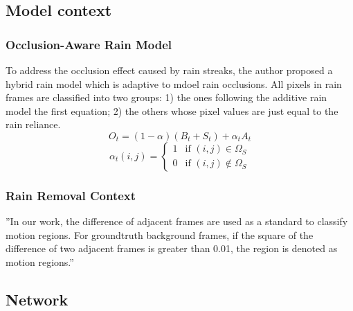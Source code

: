 \documentclass{article}
\begin{document}
\subsection{Model context}
\subsubsection{Occlusion-Aware Rain Model}
To address the occlusion effect caused by rain streaks, the author proposed a hybrid rain model which is adaptive to mdoel rain occlusions. All pixels in rain frames are classified into two groups: 1) the ones following the additive rain model the first equation; 2) the others whose pixel values are just equal to the rain reliance.
\begin{equation}
O_t=(1-\alpha)(B_t+S_t)+\alpha_tA_t
\end{equation}
\begin{equation}
\alpha_t(i,j)=
	\begin{cases}
		1 & \text{if $(i,j)\in \Omega_S$}\\
		0 & \text{if $(i,j)\not\in \Omega_S$}
	\end{cases}
\end{equation}
\subsubsection{Rain Removal Context}
''In our work, the difference of adjacent frames are used as a standard to classify motion regions. For groundtruth background frames, if the square of the difference of two adjacent frames is greater than 0.01, the region is denoted as motion regions.''

\subsection{Network}
\end{document}
